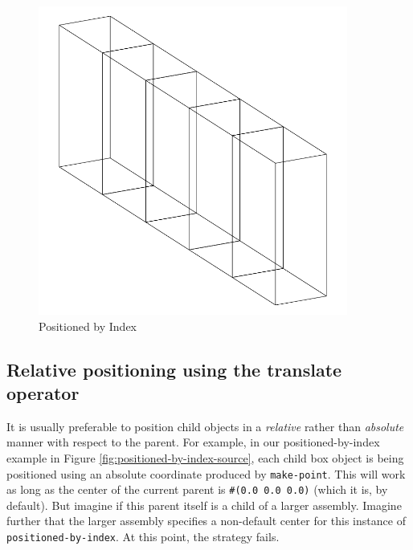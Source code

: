 \documentclass [11pt]{book}
\begin{document}
\begin{figure}
\begin{center}
\includegraphics[width=4in,height=4in]{../images/positioned-by-index.pdf}
\end{center}

\caption{Positioned by Index}

\label{fig:positioned-by-index}

\end{figure}


\subsection{Relative positioning using the translate operator}

\label{subsec:relativepositioningusingthetranslateoperator}



It is usually preferable to position child objects in a \emph{relative} rather than \emph{absolute} manner with respect to the parent. For example, in our positioned-by-index example in Figure 
\ref{fig:positioned-by-index-source}, each child box object is being positioned using an absolute coordinate produced by \texttt{make-point}. This will work as long as the center of the current parent is \texttt{\#(0.0 0.0 0.0)} (which it is, by default). But imagine if this parent
     itself is a child of a larger assembly. Imagine further that the
     larger assembly specifies a non-default center for this instance
     of \texttt{positioned-by-index}. At this point, the strategy fails.
\end{document}
